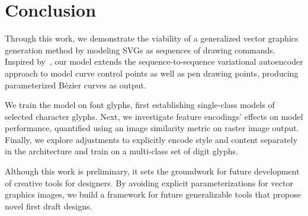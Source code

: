 \chapter{Conclusion}
Through this work, we demonstrate the viability of a generalized vector graphics generation method by modeling SVGs as sequences of drawing commands.
Inspired by~\cite{ha2017neural}, our model extends the sequence-to-sequence variational autoencoder approach to model curve control points as well as pen drawing points, producing parameterized B\'ezier curves as output.

We train the model on font glyphs, first establishing single-class models of selected character glyphs.
Next, we investigate feature encodings' effects on model performance, quantified using an image similarity metric on raster image output.
Finally, we explore adjustments to explicitly encode style and content separately in the architecture and train on a multi-class set of digit glyphs.

Although this work is preliminary, it sets the groundwork for future development of creative tools for designers.
By avoiding explicit parameterizations for vector graphics images, we build a framework for future generalizable tools that propose novel first draft designs.

